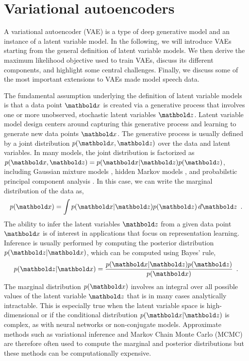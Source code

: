 \section{Variational autoencoders}

A variational autoencoder (VAE) \cite{kingma_autoencoding_2014,rezende_stochastic_2014} is a type of deep generative model and an instance of a latent variable model. In the following, we will introduce VAEs starting from the general definition of latent variable models. We then derive the maximum likelihood objective used to train VAEs, discuss its different components, and highlight some central challenges. Finally, we discuss some of the most important extensions to VAEs made model speech data. 

The fundamental assumption underlying the definition of latent variable models is that a data point $\xb$ is created via a generative process that involves one or more unobserved, stochastic latent variables  $\zb$. 
Latent variable model design centers around capturing this generative process and learning to generate new data points $\xb$. The generative process is usually defined by a joint distribution $p(\xb, \zb)$ over the data and latent variables. In many models, the joint distribution is factorized as $p(\xb,\zb) = p(\xb|\zb)p(\zb)$, including Gaussian mixture models \cite{dempster_maximum_1977}, hidden Markov models \cite{rabiner_tutorial_1989}, and probabilstic principal component analysis \cite{tipping_probabilistic_1999}. In this case, we can write the marginal distribution of the data as,
%
\begin{equation} \label{eq:latent-variable-model-marginal-distribution}
    p(\xb) = \int p(\xb|\zb)p(\zb) \, d\zb \enspace .
\end{equation}
%
The ability to infer the latent variables $\zb$ from a given data point $\xb$ is of interest in applications that focus on representation learning. Inference is usually performed by computing the posterior distribution $p(\zb|\xb)$, which can be computed using Bayes' rule,
%
\begin{equation} \label{eq:latent-variable-model-posterior-distribution}
    p(\zb|\xb) = \frac{p(\xb|\zb)p(\zb)}{p(\xb)} \enspace .
\end{equation}
%
The marginal distribution $p(\xb)$ involves an integral over all possible values of the latent variable $\zb$ that is in many cases analytically intractable. This is especially true when the latent variable space is high-dimensional or if the conditional distribution $p(\xb|\zb)$ is complex, as with neural networks or non-conjugate models. Approximate methods such as variational inference \cite{jordan_introduction_1999} and Markov Chain Monte Carlo (MCMC) \cite{mohamed_monte_2019} are therefore often used to compute the marginal and posterior distributions but these methods can be computationally expensive.

